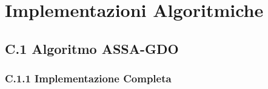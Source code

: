 
\chapter{\texorpdfstring{\textbf{Implementazioni Algoritmiche}}{Appendice C - Implementazioni Algoritmiche}}
\label{app:algoritmi}

\section{\texorpdfstring{\textbf{C.1 Algoritmo ASSA-GDO}}{C.1 - Algoritmo ASSA-GDO}}

\subsection{\texorpdfstring{\textbf{C.1.1 Implementazione Completa}}{C.1.1 - Implementazione Completa}}

